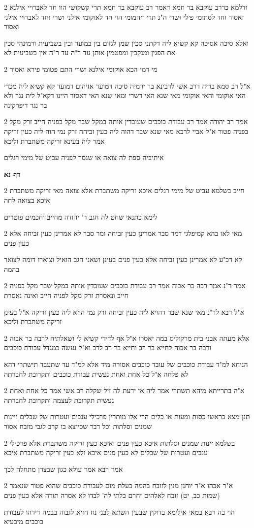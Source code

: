 \documentclass[12pt, openany]{book}
\newcommand{\sethebfont}{
\fontsize{10.5pt}{21.0pt} \selectfont
}
\newcommand{\twocol}[1]{
	{\sethebfont \begin{multicols}{2}
			#1
	\end{multicols}}	
}
\newcommand{\sectname}{}
\newcommand{\newsection}[1]{
	\addcontentsline{toc}{section}{#1}
	\renewcommand{\sectname}{#1}	
	\vspace{-\baselineskip}
	\begin{center}
		\textbf{%
\fontsize{16pt}{16pt}\selectfont
			#1}
	\end{center}
	\vspace{-\baselineskip}
	\nopagebreak
}
\begin{document}
\twocol{ודלמא כדרב עוקבא בר חמא דאמר רב עוקבא בר חמא תרי קשקושי הוו חד לאברויי אילנא ואסור וחד לסתומי פילי ושרי ה"נ תרי זיהמומי הוי חד לאוקומי אילני ושרי וחד לאברויי אילני ואסור
\par ואלא סיכה אסיכה קא קשיא ליה דקתני סכין שמן לגזום בין במועד ובין בשביעית ורמינהי סכין את הפגין ומנקבין ומפטמין אותן עד ר"ה עד ר"ה אין בשביעית לא}
\twocol{מי דמי הכא אוקומי אילנא ושרי התם פטומי פירא ואסור
\par א"ל רב סמא בריה דרב אשי לרבינא בר ירמיה סיכה דמועד אזיהום דמועד קא קשיא ליה מכדי האי אוקומי והאי אוקומי מאי שנא האי דשרי ומאי שנא האי דאסור היינו דקא"ל לית נגר ולא בר נגר דיפרקינה}
\twocol{אמר רב יהודה אמר רב עבודת כוכבים שעובדין אותה במקל שבר מקל בפניה חייב זרק מקל בפניה פטור א"ל אביי לרבא מאי שנא שבר דהוה ליה כעין זביחה זרק נמי הוה ליה כעין זריקה אמר ליה בעינא זריקה משתברת וליכא
\par איתיביה ספת לה צואה או שנסך לפניה עביט של מימי רגלים}
\newsection{דף נא}
\twocol{חייב בשלמא עביט של מימי רגלים איכא זריקה משתברת אלא צואה מאי זריקה משתברת איכא בצואה לחה
\par לימא כתנאי שחט לה חגב ר' יהודה מחייב וחכמים פוטרים}
\twocol{מאי לאו בהא קמיפלגי דמר סבר אמרינן כעין זביחה ומר סבר לא אמרינן כעין זביחה אלא כעין פנים
\par לא דכ"ע לא אמרינן כעין זביחה אלא כעין פנים בעינן ושאני חגב הואיל וצוארו דומה לצואר בהמה}
\twocol{אמר ר"נ אמר רבה בר אבוה אמר רב עבודת כוכבים שעובדין אותה במקל שבר מקל בפניה חייב ונאסרת זרק מקל לפניה חייב ואינה נאסרת
\par א"ל רבא לר"נ מאי שנא שבר דהויא ליה כעין זביחה זרק נמי הויא ליה כעין זריקה א"ל בעינן זריקה משתברת וליכא}
\twocol{אלא מעתה אבני בית מרקוליס במה יאסרו א"ל אף לדידי קשיא לי ושאלתיה לרבה בר אבוה ורבה בר אבוה לחייא בר רב וחייא בר רב לרב וא"ל נעשה כמגדל עבודת כוכבים
\par הניחא למ"ד עבודת כוכבים של עובד כוכבים אסורה מיד אלא למ"ד עד שתעבד תישתרי דהא לא פלחה א"ל כל אחת ואחת נעשית עבודת כוכבים ותקרובת לחברתה}
\twocol{א"ה בתרייתא מיהא תשתרי אמר ליה אי ידעת לה זיל שקלה רב אשי אמר כל אחת ואחת נעשית תקרובת לעצמה ותקרובת לחברתה
\par תנן מצא בראשו כסות ומעות או כלים הרי אלו מותרין פרכילי ענבים ועטרות של שבלים ויינות שמנים וסלתות וכל דבר שכיוצא בו קרב לגבי מזבח אסור}
\twocol{בשלמא יינות שמנים וסלתות איכא כעין פנים ואיכא כעין זריקה משתברת אלא פרכילי ענבים ועטרות של שבלים לא כעין פנים איכא ולא כעין זריקה משתברת איכא
\par אמר רבא אמר עולא כגון שבצרן מתחלה לכך}
\twocol{א"ר אבהו א"ר יוחנן מנין לזובח בהמה בעלת מום לעבודת כוכבים שהוא פטור שנאמר (שמות כב, יט) זובח לאלהים יחרם בלתי לה' לבדו לא אסרה תורה אלא כעין פנים
\par הוי בה רבא במאי אילימא בדוקין שבעין השתא לבני נח חזיא לגבוה בבמה דידהו לעבודת כוכבים מיבעיא}
\end{document}
